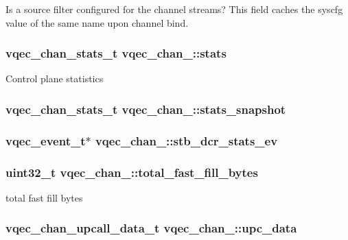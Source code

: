 Is a source filter configured for the channel streams? This field caches the syscfg value of the same name upon channel bind. 
\subsubsection{\setlength{\rightskip}{0pt plus 5cm}\bf{vqec\_\-chan\_\-stats\_\-t} \bf{vqec\_\-chan\_\-::stats}}\label{structvqec__chan___23b14675ec3122b0c60e218c11dc9d93}


Control plane statistics 
\subsubsection{\setlength{\rightskip}{0pt plus 5cm}\bf{vqec\_\-chan\_\-stats\_\-t} \bf{vqec\_\-chan\_\-::stats\_\-snapshot}}\label{structvqec__chan___3ad235306ab286ee0c6a8a20040070b8}


\subsubsection{\setlength{\rightskip}{0pt plus 5cm}vqec\_\-event\_\-t$\ast$ \bf{vqec\_\-chan\_\-::stb\_\-dcr\_\-stats\_\-ev}}\label{structvqec__chan___3398b9c053caa1a7d6a6a6051ec62671}


\subsubsection{\setlength{\rightskip}{0pt plus 5cm}uint32\_\-t \bf{vqec\_\-chan\_\-::total\_\-fast\_\-fill\_\-bytes}}\label{structvqec__chan___c1541a4e1451324ad75adf574943c375}


total fast fill bytes 
\subsubsection{\setlength{\rightskip}{0pt plus 5cm}\bf{vqec\_\-chan\_\-upcall\_\-data\_\-t} \bf{vqec\_\-chan\_\-::upc\_\-data}}\label{structvqec__chan___85ec79ea81d64ce5b693d42fb43a54b3}


